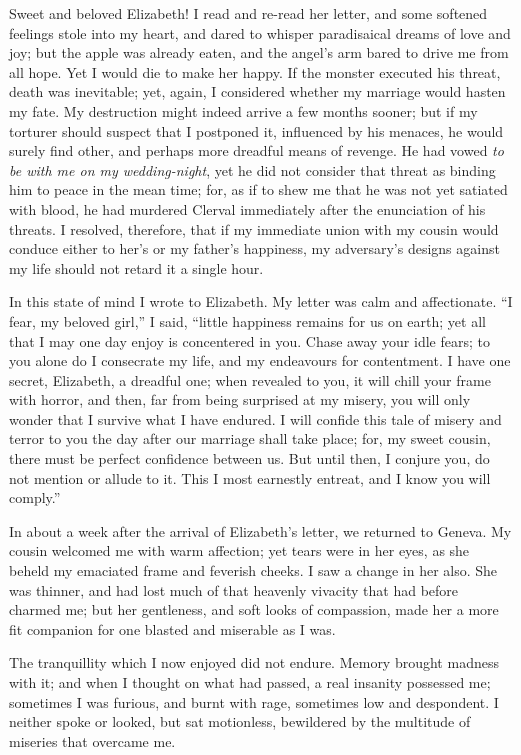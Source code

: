 Sweet and beloved Elizabeth! I
read and re-read her letter, and some
softened feelings stole into my heart,
and dared to whisper paradisaical
dreams of love and joy; but the apple
was already eaten, and the angel's arm
bared to drive me from all hope. Yet
I would die to make her happy. If the
monster executed his threat, death was
inevitable; yet, again, I considered
whether my marriage would hasten my
fate. My destruction might indeed
arrive a few months sooner; but if my
torturer should suspect that I postponed
it, influenced by his menaces,
he would surely find other, and perhaps
more dreadful means of revenge.
He had vowed \emph{to be with me on my
wedding-night}, yet he did not consider
that threat as binding him to peace in
the mean time; for, as if to shew me
that he was not yet satiated with blood,
he had murdered Clerval immediately
after the enunciation of his threats. I
resolved, therefore, that if my immediate
union with my cousin would conduce
either to her's or my father's happiness,
my adversary's designs against
my life should not retard it a single
hour.

In this state of mind I wrote to Elizabeth.
My letter was calm and affectionate.
``I fear, my beloved girl,'' I
said, ``little happiness remains for us
on earth; yet all that I may one day
enjoy is concentered in you. Chase
away your idle fears; to you alone do I
consecrate my life, and my endeavours
for contentment. I have one secret,
Elizabeth, a dreadful one; when revealed
to you, it will chill your frame
with horror, and then, far from being
surprised at my misery, you will only
wonder that I survive what I have endured.
I will confide this tale of
misery and terror to you the day after
our marriage shall take place; for, my
sweet cousin, there must be perfect confidence
between us. But until then, I
conjure you, do not mention or allude
to it. This I most earnestly entreat,
and I know you will comply.''

In about a week after the arrival of
Elizabeth's letter, we returned to Geneva.
My cousin welcomed me with
warm affection; yet tears were in her
eyes, as she beheld my emaciated frame
and feverish cheeks. I saw a change
in her also. She was thinner, and had
lost much of that heavenly vivacity that
had before charmed me; but her gentleness,
and soft looks of compassion,
made her a more fit companion for one
blasted and miserable as I was.

The tranquillity which I now enjoyed
did not endure. Memory brought
madness with it; and when I thought
on what had passed, a real insanity possessed
me; sometimes I was furious,
and burnt with rage, sometimes low
and despondent. I neither spoke or
looked, but sat motionless, bewildered
by the multitude of miseries that overcame
me.

